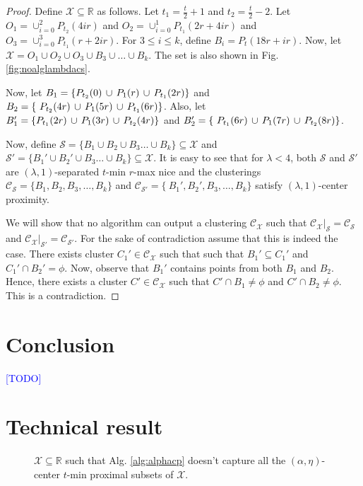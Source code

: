 \documentclass[anon,12pt]{colt2016} %
\newcommand{\mc}{\mathcal}
\newcommand{\todo}{\textcolor{blue}{[TODO]}\xspace}
\begin{document}
\begin{proof}
Define $\mc X \subseteq \mathbb{R}$ as follows. Let $t_1 = \frac{t}{2}+1$ and $t_2 = \frac{t}{2}-2$. Let $O_1 = \cup_{i=0}^2 P_{t_2}(4ir)$ and $O_2 = \cup_{i=0}^1 P_{t_1}(2r+4ir)$ and $O_3 = \cup_{i=0}^3 P_{t_1}(r+2ir)$. For $3\le i\le k$, define $B_i = P_t(18r+ir)$. Now, let $\mc X = O_1 \cup O_2 \cup O_3 \cup B_3 \cup \ldots \cup B_k$. The set is also shown in Fig. \ref{fig:noalglambdacs}.

Now, let $B_1 = \{P_{t_2}(0) \thinspace\cup\thinspace  P_{1}(r) \thinspace\cup\thinspace P_{t_1}(2r) \}$ and $B_2 = \{\ P_{t_2}(4r) \thinspace\cup\thinspace P_{1}(5r)\thinspace\cup\thinspace P_{t_1}(6r)\}$. Also, let $B_1' = \{P_{t_1}(2r) \thinspace\cup\thinspace  P_{1}(3r) \thinspace\cup\thinspace P_{t_2}(4r) \}$ and $B_2' = \{\ P_{t_1}(6r) \thinspace\cup\thinspace P_{1}(7r)\thinspace\cup\thinspace P_{t_2}(8r)\}$.

Now, define $\mc S = \{B_1 \cup B_2 \cup B_3\ldots \cup B_k\} \subseteq \mc X$ and $\mc S' = \{B_1' \cup B_2' \cup B_3\ldots \cup B_k\} \subseteq \mc X$. It is easy to see that for $\lambda < 4$, both $\mc S$ and $\mc S'$ are $(\lambda, 1)$-separated $t$-min $r$-max nice and the clusterings $\mc C_{\mc S} = \{B_1, B_2, B_3, \ldots, B_k\}$ and $\mc C_{\mc S'} = \{\ B_1', B_2', B_3, \ldots, B_k\}$ satisfy $(\lambda, 1)$-center proximity. 

We will show that no algorithm can output a clustering $\mc C_{\mc X}$ such that $\mc C_{\mc X}|_{\mc S} = \mc C_{\mc S}$ and $\mc C_{\mc X}|_{\mc S'} = \mc C_{\mc S'}$. For the sake of contradiction assume that this is indeed the case. There exists cluster $C_1' \in \mc C_{\mc X}$ such that such that $B_1' \subseteq C_1'$ and $C_1' \cap B_2' = \phi$. Now, observe that $B_1'$ contains points from both $B_1$ and $B_2$. Hence, there exists a cluster $C' \in \mc C_{\mc X}$ such that $C' \cap B_1 \neq \phi$ and $C' \cap B_2 \neq \phi$. This is a contradiction.
\end{proof}


\section{Conclusion}
\todo


 


\appendix
\section{Technical result}
\label{appendix:sectiontr}
\begin{figure}

\caption{$\mc X \subseteq \mathbb{R}$ such that Alg. \ref{alg:alphacp} doesn't capture all the $(\alpha, \eta)$-center $t$-min proximal subsets of $\mc X$.}
\label{fig:algAlphacp}
\end{figure}
\end{document}
